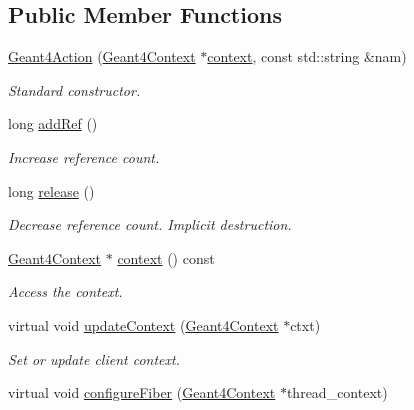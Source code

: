 \subsection*{Public Member Functions}
\begin{DoxyCompactItemize}
\item 
\hyperlink{class_d_d4hep_1_1_simulation_1_1_geant4_action_a030276e3d60d7da13a2339f0d87ed52e}{Geant4\+Action} (\hyperlink{class_d_d4hep_1_1_simulation_1_1_geant4_context}{Geant4\+Context} $\ast$\hyperlink{class_d_d4hep_1_1_simulation_1_1_geant4_action_aa9d87f0ec2a72b7fc2591b18f98d75cf}{context}, const std\+::string \&nam)
\begin{DoxyCompactList}\small\item\em Standard constructor. \end{DoxyCompactList}\item 
long \hyperlink{class_d_d4hep_1_1_simulation_1_1_geant4_action_abf90df73db256488940810101fd63a8a}{add\+Ref} ()
\begin{DoxyCompactList}\small\item\em Increase reference count. \end{DoxyCompactList}\item 
long \hyperlink{class_d_d4hep_1_1_simulation_1_1_geant4_action_a3afba3ee937fdbd25d27994e4e75c5ac}{release} ()
\begin{DoxyCompactList}\small\item\em Decrease reference count. Implicit destruction. \end{DoxyCompactList}\item 
\hyperlink{class_d_d4hep_1_1_simulation_1_1_geant4_context}{Geant4\+Context} $\ast$ \hyperlink{class_d_d4hep_1_1_simulation_1_1_geant4_action_aa9d87f0ec2a72b7fc2591b18f98d75cf}{context} () const
\begin{DoxyCompactList}\small\item\em Access the context. \end{DoxyCompactList}\item 
virtual void \hyperlink{class_d_d4hep_1_1_simulation_1_1_geant4_action_ae3b9daf2af881df956c46568c0743313}{update\+Context} (\hyperlink{class_d_d4hep_1_1_simulation_1_1_geant4_context}{Geant4\+Context} $\ast$ctxt)
\begin{DoxyCompactList}\small\item\em Set or update client context. \end{DoxyCompactList}\item 
virtual void \hyperlink{class_d_d4hep_1_1_simulation_1_1_geant4_action_a6adc7138508303e4e417cb48a737ab19}{configure\+Fiber} (\hyperlink{class_d_d4hep_1_1_simulation_1_1_geant4_context}{Geant4\+Context} $\ast$thread\+\_\+context)

\end{DoxyCompactItemize}
